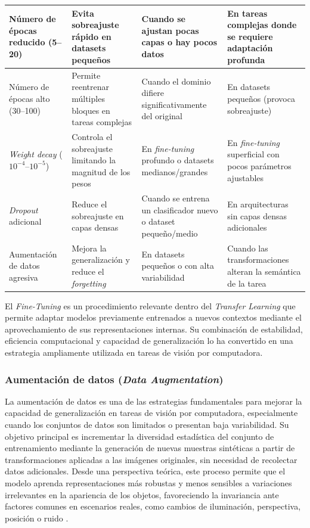 \begin{longtable}{|p{3.2cm}|p{3.5cm}|p{3.5cm}|p{3.5cm}|}
		Número de épocas reducido (5--20) &
		Evita sobreajuste rápido en datasets pequeños &
		Cuando se ajustan pocas capas o hay pocos datos &
		En tareas complejas donde se requiere adaptación profunda \\
		\hline
		
		Número de épocas alto (30--100) &
		Permite reentrenar múltiples bloques en tareas complejas &
		Cuando el dominio difiere significativamente del original &
		En datasets pequeños (provoca sobreajuste) \\
		\hline
		
		\textit{Weight decay} ($10^{-4}$--$10^{-5}$) &
		Controla el sobreajuste limitando la magnitud de los pesos &
		En \textit{fine-tuning} profundo o datasets medianos/grandes &
		En \textit{fine-tuning} superficial con pocos parámetros ajustables \\
		\hline
		
		\textit{Dropout} adicional &
		Reduce el sobreajuste en capas densas &
		Cuando se entrena un clasificador nuevo o dataset pequeño/medio &
		En arquitecturas sin capas densas adicionales \\
		\hline
		
		Aumentación de datos agresiva &
		Mejora la generalización y reduce el \textit{forgetting} &
		En datasets pequeños o con alta variabilidad &
		Cuando las transformaciones alteran la semántica de la tarea \\
		\hline
		
	\end{longtable}
	El \textit{Fine-Tuning} es un procedimiento relevante dentro del \textit{Transfer Learning} que permite adaptar modelos previamente entrenados a nuevos contextos mediante el aprovechamiento de sus representaciones internas. Su combinación de estabilidad, eficiencia computacional y capacidad de generalización lo ha convertido en una estrategia ampliamente utilizada en tareas de visión por computadora.
	
	\subsubsection{Aumentación de datos (\textit{Data Augmentation})}
	
	La aumentación de datos es una de las estrategias fundamentales para mejorar la capacidad de generalización en tareas de visión por computadora, especialmente cuando los conjuntos de datos son limitados o presentan baja variabilidad. Su objetivo principal es incrementar la diversidad estadística del conjunto de entrenamiento mediante la generación de nuevas muestras sintéticas a partir de transformaciones aplicadas a las imágenes originales, sin necesidad de recolectar datos adicionales. Desde una perspectiva teórica, este proceso permite que el modelo aprenda representaciones más robustas y menos sensibles a variaciones irrelevantes en la apariencia de los objetos, favoreciendo la invariancia ante factores comunes en escenarios reales, como cambios de iluminación, perspectiva, posición o ruido \cite{shorten2019, perez2017}.
	

